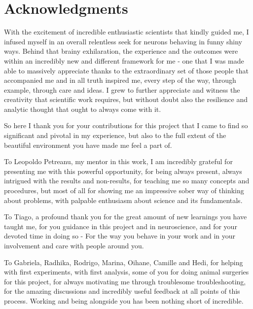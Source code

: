 
\section*{Acknowledgments} 

With the excitement of incredible enthusiastic scientists that kindly guided me, I infused myself in an overall relentless seek for neurons behaving in funny shiny ways. Behind that brainy exhilaration, the experience and the outcomes were within an incredibly new and different framework for me - one that I was made able to massively appreciate thanks to the extraordinary set of those people that accompanied me and in all truth inspired me, every step of the way, through example, through care and ideas. I grew to further appreciate and witness the creativity that scientific work requires, but without doubt also the resilience and analytic thought that ought to always come with it.

So here I thank you for your contributions for this project that I came to find so significant and pivotal in my experience, but also to the full extent of the beautiful environment you have made me feel a part of.

To Leopoldo Petreanu, my mentor in this work, I am incredibly grateful for presenting me with this powerful opportunity, for being always present, always intrigued with the results and non-results, for teaching me so many concepts and procedures, but most of all for showing me an impressive sober way of thinking about problems, with palpable enthusiasm about science and its fundamentals.

To Tiago, a profound thank you for the great amount of new learnings you have taught me, for you guidance in this project and in neuroscience, and for your devoted time in doing so - For the way you behave in your work and in your involvement and care with people around you.

To Gabriela, Radhika, Rodrigo, Marina, Oihane, Camille and Hedi, for helping with first experiments, with first analysis, some of you for doing animal surgeries for this project, for always motivating me through troublesome troubleshooting, for the amazing discussions and incredibly useful feedback at all points of this process. Working and being alongside you has been nothing short of incredible. 

